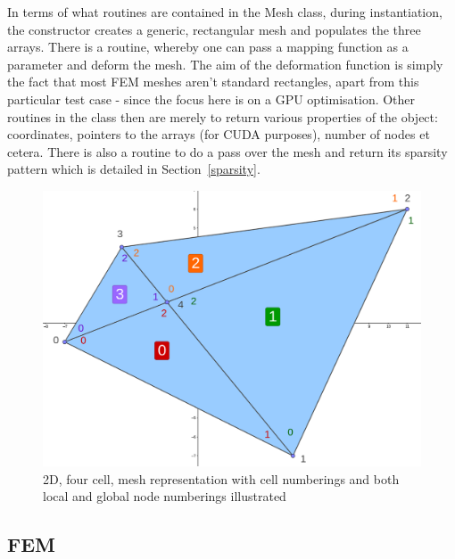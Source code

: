 In terms of what routines are contained in the Mesh class, during instantiation, the constructor creates a generic, rectangular mesh and populates the three arrays. There is a routine, whereby one can pass a mapping function as a parameter and deform the mesh. The aim of the deformation function is simply the fact that most FEM meshes aren't standard rectangles, apart from this particular test case - since the focus here is on a GPU optimisation. Other routines in the class then are merely to return various properties of the object: coordinates, pointers to the arrays (for CUDA purposes), number of nodes et cetera. There is also a routine to do a pass over the mesh and return its sparsity pattern which is detailed in Section~\ref{sparsity}.
\begin{figure}
	\centering
	\includegraphics[width = 0.5\linewidth]{Figures/4cell_example}
	\caption{2D, four cell, mesh representation with cell numberings and both local and global node numberings illustrated}
	\label{fig:4cell}
\end{figure}
\subsection{FEM}

